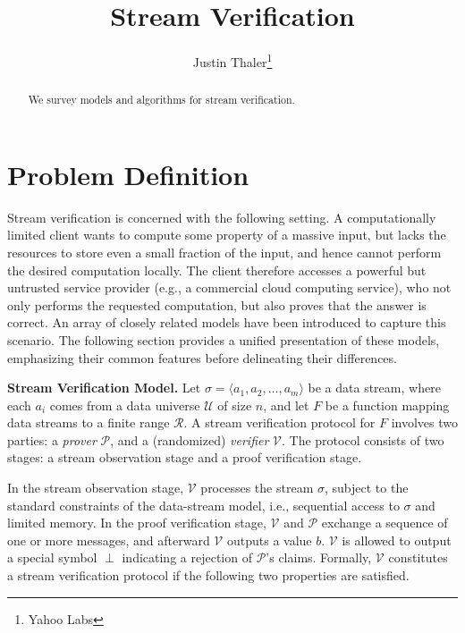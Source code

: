 \documentclass[11pt, letterpaper]{article}
\newcommand{\stream}{{\sigma}}
\newcommand{\length}{m}
\newcommand{\uni}{\mathcal{U}}
\newcommand{\cV}{\mathcal{V}}
\newcommand{\cP}{\mathcal{P}}
\begin{document}
\title{Stream Verification}

\author{Justin Thaler\thanks{Yahoo Labs}}

\maketitle 

\begin{abstract}
We survey models and algorithms for stream verification. 
\end{abstract}

\section{Problem Definition}

Stream verification is concerned with the following setting. 
A computationally limited client wants to compute some property of a massive input, but lacks the resources to store even a small fraction of the input, and hence cannot perform the desired computation locally. The client therefore accesses a powerful but untrusted service provider (e.g., a commercial cloud computing service), who not only performs the requested computation, but also proves that the answer is correct.
An array of closely related models have been introduced to capture this scenario. The following section provides a unified presentation of these models, emphasizing their common features before delineating their differences. 

\medskip
\noindent \textbf{Stream Verification Model.}
Let $\stream = \langle a_1, a_2, \dots , a_\length \rangle$ be a data stream, where each $a_i$ comes from a data universe $\uni$ of size $n$, and let $F$ be a function mapping data streams to a finite range $\mathcal{R}$. 
A stream verification protocol for $F$ involves two parties: a \emph{prover} $\cP$, and a (randomized) \emph{verifier} $\cV$. The protocol consists of two stages:  a stream observation stage and a proof verification stage. 
 
In the stream observation stage, $\cV$ processes the stream $\stream$, subject to the 
standard constraints of the data-stream model, i.e., sequential access to $\stream$ and limited memory. 
In the proof verification stage, $\cV$ and $\cP$ exchange a sequence of one or more messages, and afterward $\cV$ outputs a value $b$. $\cV$ is allowed to output a special symbol $\perp$ indicating a rejection of $\cP$'s claims.  Formally, $\cV$ constitutes a stream verification protocol if the following two properties are satisfied.
\end{document}

